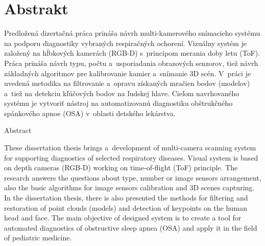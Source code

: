 
\chapter*{Abstrakt} \label{kap:Abstrakt}

Predložená dizertačná práca prináša návrh multi-kamerového snímacieho systému na podporu diagnostiky vybraných respiračných ochorení. Vizuálny systém je založený na hĺbkových kamerách (RGB-D) s princípom merania doby letu (ToF). Práca prináša návrh typu, počtu a usporiadania obrazových senzorov, tiež návrh základných algoritmov pre kalibrovanie kamier a snímanie 3D scén. V práci je uvedená metodika na filtrovanie a opravu získaných mračien bodov (modelov) a tiež na detekciu kľúčových bodov na ľudskej hlave. Cieľom navrhovaného systému je vytvoriť nástroj na automatizovanú diagnostiku obštrukčného spánkového apnoe (OSA) v oblasti detského lekárstva. \newline


{\LARGE Abstract}

These dissertation thesis brings a development of multi-camera scanning system for supporting diagnostics of selected respiratory diseases. Visual system is based on depth cameras (RGB-D) working on time-of-flight (ToF) principle. The research answers the questions about type, number or image sensors arrangement, also the basic algorithms for image sensors calibration and 3D scenes capturing. In the dissertation thesis, there is also presented the methods for filtering and restoration of point clouds (models) and detection of keypoints on the human head and face. The main objective of designed system is to create a tool for automated diagnostics of obstructive sleep apnea (OSA) and apply it in the field of pediatric medicine. 
